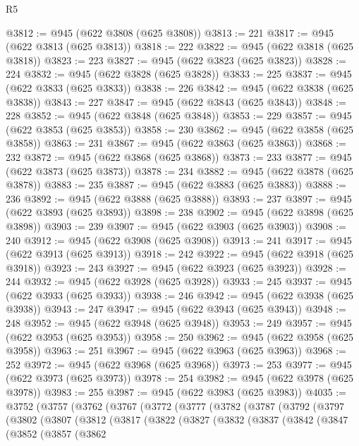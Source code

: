 \begin{lexlean}{R5}
\begin{coremodule}
@3812 := @945 (@622 @3808 (@625 @3808))
@3813 := 221
@3817 := @945 (@622 @3813 (@625 @3813))
@3818 := 222
@3822 := @945 (@622 @3818 (@625 @3818))
@3823 := 223
@3827 := @945 (@622 @3823 (@625 @3823))
@3828 := 224
@3832 := @945 (@622 @3828 (@625 @3828))
@3833 := 225
@3837 := @945 (@622 @3833 (@625 @3833))
@3838 := 226
@3842 := @945 (@622 @3838 (@625 @3838))
@3843 := 227
@3847 := @945 (@622 @3843 (@625 @3843))
@3848 := 228
@3852 := @945 (@622 @3848 (@625 @3848))
@3853 := 229
@3857 := @945 (@622 @3853 (@625 @3853))
@3858 := 230
@3862 := @945 (@622 @3858 (@625 @3858))
@3863 := 231
@3867 := @945 (@622 @3863 (@625 @3863))
@3868 := 232
@3872 := @945 (@622 @3868 (@625 @3868))
@3873 := 233
@3877 := @945 (@622 @3873 (@625 @3873))
@3878 := 234
@3882 := @945 (@622 @3878 (@625 @3878))
@3883 := 235
@3887 := @945 (@622 @3883 (@625 @3883))
@3888 := 236
@3892 := @945 (@622 @3888 (@625 @3888))
@3893 := 237
@3897 := @945 (@622 @3893 (@625 @3893))
@3898 := 238
@3902 := @945 (@622 @3898 (@625 @3898))
@3903 := 239
@3907 := @945 (@622 @3903 (@625 @3903))
@3908 := 240
@3912 := @945 (@622 @3908 (@625 @3908))
@3913 := 241
@3917 := @945 (@622 @3913 (@625 @3913))
@3918 := 242
@3922 := @945 (@622 @3918 (@625 @3918))
@3923 := 243
@3927 := @945 (@622 @3923 (@625 @3923))
@3928 := 244
@3932 := @945 (@622 @3928 (@625 @3928))
@3933 := 245
@3937 := @945 (@622 @3933 (@625 @3933))
@3938 := 246
@3942 := @945 (@622 @3938 (@625 @3938))
@3943 := 247
@3947 := @945 (@622 @3943 (@625 @3943))
@3948 := 248
@3952 := @945 (@622 @3948 (@625 @3948))
@3953 := 249
@3957 := @945 (@622 @3953 (@625 @3953))
@3958 := 250
@3962 := @945 (@622 @3958 (@625 @3958))
@3963 := 251
@3967 := @945 (@622 @3963 (@625 @3963))
@3968 := 252
@3972 := @945 (@622 @3968 (@625 @3968))
@3973 := 253
@3977 := @945 (@622 @3973 (@625 @3973))
@3978 := 254
@3982 := @945 (@622 @3978 (@625 @3978))
@3983 := 255
@3987 := @945 (@622 @3983 (@625 @3983))
@4035 := @3752
    (@3757
      (@3762
        (@3767
          (@3772
            (@3777
              (@3782
                (@3787
                  (@3792
                    (@3797
                      (@3802
                        (@3807
                          (@3812
                            (@3817
                              (@3822
                                (@3827
                                  (@3832
                                    (@3837
                                      (@3842
                                        (@3847
                                          (@3852
                                            (@3857
                                              (@3862

\end{coremodule}
\end{lexlean}
